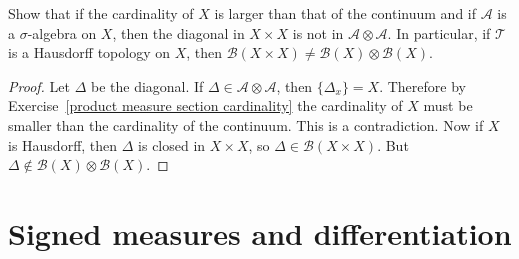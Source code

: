 \begin{exercise}\label{product Borel algebra unequal eg}
Show that if the cardinality of $X$ is larger than that of the continuum and if $\mathcal{A}$ is a $\sigma$-algebra on $X$, then the diagonal in $X\times X$ is not in $\mathcal{A}\otimes\mathcal{A}$. In particular, if $\mathcal{T}$ is a Hausdorff topology on $X$, then $\mathcal{B}(X\times X)\neq\mathcal{B}(X)\otimes\mathcal{B}(X)$.
\end{exercise}
\begin{proof}
Let $\Delta$ be the diagonal. If $\Delta\in\mathcal{A}\otimes\mathcal{A}$, then $\{\Delta_x\}=X$. Therefore by Exercise~\ref{product measure section cardinality} the cardinality of $X$ must be smaller than the cardinality of the continuum. This is a contradiction. Now if $X$ is Hausdorff, then $\Delta$ is closed in $X\times X$, so $\Delta\in\mathcal{B}(X\times X)$. But $\Delta\notin\mathcal{B}(X)\otimes\mathcal{B}(X)$.
\end{proof}
\newpage
\chapter{Signed measures and differentiation}
